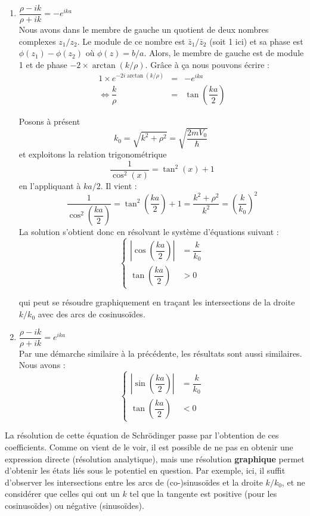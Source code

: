 \documentclass{book}
\begin{document}
  \begin{enumerate}%
    \item $\dfrac{\rho - ik}{\rho + ik} = -e^{ika}$ \\
    Nous avons dans le membre de gauche un quotient de deux nombres complexes $z_1/z_2$. Le module de ce nombre est $\bar z_1/\bar z_2$ (soit 1 ici) et sa phase est $\phi(z_1) - \phi(z_2)$ où $\phi(z) = b/a$. Alors, le membre de gauche est de module 1 et de phase $-2\times \arctan(k/\rho)$. Grâce à ça nous pouvons écrire :
    \begin{eqnarray*}
      1\times e^{-2i\arctan(k/\rho)} &=& - e^{ika} \\
      \iff \dfrac{k}{\rho} &=& \tan\left(\dfrac{ka}{2}\right)
    \end{eqnarray*}
    
    Posons à présent $$k_0 = \sqrt{k^2 + \rho ^2} = \sqrt{\dfrac{2mV_0}{\hbar}}\; $$ et exploitons la relation trigonométrique $$\dfrac{1}{\cos ^2(x)} = \tan^2(x) +1$$ en l'appliquant à $ka/2$. Il vient :
    $$\dfrac{1}{\cos ^2\left(\dfrac{ka}{2}\right)} = \tan^2\left(\dfrac{ka}{2}\right) +1  = \dfrac{k^2 + \rho^2}{k^2} = \left(\dfrac{k}{k_0}\right)^2$$
    La solution s'obtient donc en résolvant le système d'équations suivant :
    \begin{equation}
      \left\{ \begin{array}{ll}
        \left| \cos \left(\dfrac{ka}{2}\right)\right| &= \dfrac{k}{k_0} \\
        \tan \left(\dfrac{ka}{2}\right) &>0
      \end{array}\right.
    \end{equation}
    
    qui peut se résoudre graphiquement en traçant les intersections de la droite $k/k_0$ avec des arcs de cosinusoïdes. \\
    \item $\dfrac{\rho - ik}{\rho + ik} = e^{ika}$ \\
    
    Par une démarche similaire à la précédente, les résultats sont aussi similaires. Nous avons :
    \begin{equation}
      \left\{ \begin{array}{ll}
        \left| \sin \left(\dfrac{ka}{2}\right)\right| &= \dfrac{k}{k_0} \\
      \tan \left(\dfrac{ka}{2}\right) &<0
    \end{array}\right.
  \end{equation}
\end{enumerate}
La résolution de cette équation de Schrödinger passe par l'obtention de ces coefficients. Comme on vient de le voir, il est possible de ne pas en obtenir une expression directe (résolution analytique), mais une résolution \textbf{graphique} permet d'obtenir les états liés sous le potentiel en question. Par exemple, ici, il suffit d'observer les intersections entre les arcs de (co-)sinusoïdes et la droite $k/k_0$, et ne considérer que celles qui ont un $k$ tel que la tangente est positive (pour les cosinusoïdes) ou négative (sinusoïdes). 
\end{document}
